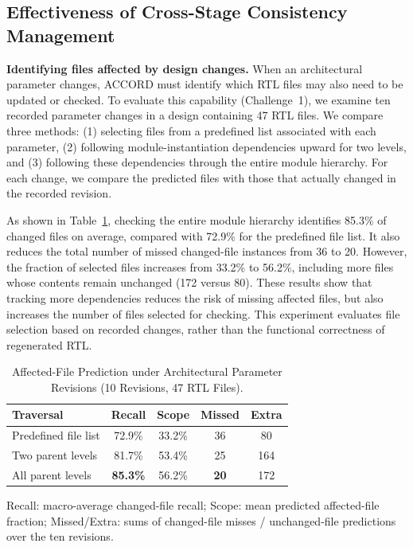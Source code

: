 \documentclass[9pt,conference]{IEEEtran}
\begin{document}
\subsection{Effectiveness of Cross-Stage Consistency Management}
\textbf{Identifying files affected by design changes.}
When an architectural parameter changes, ACCORD must
identify which RTL files may also need to be updated
or checked. To evaluate this capability (Challenge~1),
we examine ten recorded parameter changes in a design
containing 47 RTL files. We compare three methods:
(1) selecting files from a predefined list associated
with each parameter, (2) following module-instantiation
dependencies upward for two levels, and (3) following
these dependencies through the entire module hierarchy.
For each change, we compare the predicted files with
those that actually changed in the recorded revision.

As shown in Table~\ref{tab:propbench_new}, checking
the entire module hierarchy identifies 85.3\% of
changed files on average, compared with 72.9\% for
the predefined file list. It also reduces the total
number of missed changed-file instances from 36 to 20.
However, the fraction of selected files increases
from 33.2\% to 56.2\%, including more files whose
contents remain unchanged (172 versus 80).
These results show that tracking more dependencies
reduces the risk of missing affected files, but also
increases the number of files selected for checking.
This experiment evaluates file selection based on
recorded changes, rather than the functional
correctness of regenerated RTL.


\begin{table}[t]
\centering
\caption{Affected-File Prediction under Architectural Parameter Revisions (10 Revisions, 47 RTL Files).}
\label{tab:propbench_new}
\footnotesize
\setlength{\tabcolsep}{3pt}
\renewcommand{\arraystretch}{1.10}
\begin{tabular*}{\columnwidth}{@{\extracolsep{\fill}}lcccc@{}}
\toprule
\textbf{Traversal} & \textbf{Recall} & \textbf{Scope} & \textbf{Missed} & \textbf{Extra} \\
\midrule
Predefined file list & 72.9\% & 33.2\% & 36 & 80 \\
Two parent levels & 81.7\% & 53.4\% & 25 & 164 \\
All parent levels & \textbf{85.3\%} & 56.2\% & \textbf{20} & 172 \\
\bottomrule
\end{tabular*}
\vspace{1pt}
{\raggedright\scriptsize Recall: macro-average changed-file recall; Scope: mean predicted affected-file fraction; Missed/Extra: sums of changed-file misses / unchanged-file predictions over the ten revisions.\par}
\vspace{-5pt}
\end{table}
\end{document}
